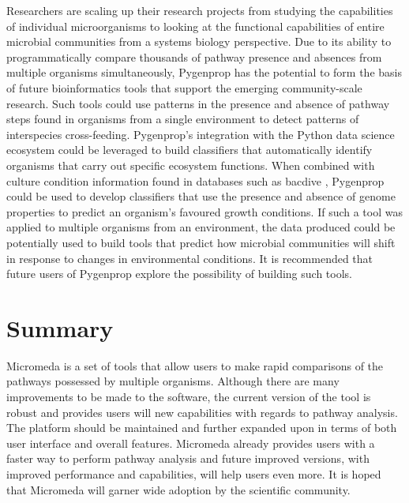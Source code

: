 Researchers are scaling up their research projects from studying the 
capabilities of individual microorganisms to looking at the functional 
capabilities of entire microbial communities from a systems biology perspective. 
Due to its ability to programmatically compare thousands of pathway presence and 
absences from multiple organisms simultaneously, Pygenprop has the potential to 
form the basis of future bioinformatics tools that support the emerging 
community-scale research. Such tools could use patterns in the presence and 
absence of pathway steps found in organisms from a single environment to detect 
patterns of interspecies cross-feeding. Pygenprop's integration with the Python 
data science ecosystem could be leveraged to build classifiers that 
automatically identify organisms that carry out specific ecosystem functions. 
When combined with culture condition information found in databases such as 
\gls{bacdive} \cite{reimer2018bac}, Pygenprop could be used to develop classifiers 
that use the presence and absence of genome properties to predict an organism's 
favoured growth conditions. If such a tool was applied to multiple organisms 
from an environment, the data produced could be potentially used to build tools 
that predict how microbial communities will shift in response to changes in 
environmental conditions. It is recommended that future users of Pygenprop 
explore the possibility of building such tools.

\section{Summary}

Micromeda is a set of tools that allow users to make rapid comparisons of the 
pathways possessed by multiple organisms. Although there are many improvements 
to be made to the software, the current version of the tool is robust and 
provides users will new capabilities with regards to pathway analysis. The 
platform should be maintained and further expanded upon in terms of both user 
interface and overall features. Micromeda already provides users with a faster 
way to perform pathway analysis and future improved versions, with improved 
performance and capabilities, will help users even more. It is hoped that 
Micromeda will garner wide adoption by the scientific community.
